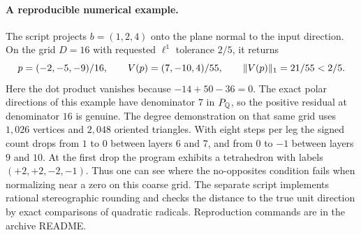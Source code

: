 \paragraph{A reproducible numerical example.}
The script  projects $b=(1,2,4)$ onto the plane
normal to the input direction. On the grid $D=16$ with requested
$\ell^1$ tolerance $2/5$, it returns
\[
 p=(-2,-5,-9)/16,\qquad V(p)=(7,-10,4)/55,\qquad
 \lVert V(p)\rVert_1=21/55<2/5.
\]
Here the dot product vanishes because $-14+50-36=0$. The exact polar
directions of this example have denominator $7$ in $P_\mathbb Q$, so the
positive residual at denominator $16$ is genuine. The degree demonstration
on that same grid uses $1{,}026$ vertices and $2{,}048$ oriented
triangles. With eight steps per leg the signed count drops from $1$
to $0$ between layers $6$ and $7$, and from $0$ to $-1$ between layers
$9$ and $10$. At the first drop the program exhibits a tetrahedron with
labels $(+2,+2,-2,-1)$. Thus one can see where the no-opposites condition
fails when normalizing near a zero on this coarse grid. The separate script
 implements rational stereographic rounding
and checks the distance to the true unit direction by exact comparisons
of quadratic radicals. Reproduction commands are in the archive README.
